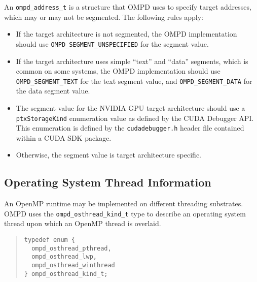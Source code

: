 An \verb|ompd_address_t| is a structure that OMPD uses to specify
target addresses, which may or may not be segmented.  The following
rules apply:
\begin{itemize}
%
\item
If the target architecture is not segmented, the OMPD implementation
should use \verb|OMPD_SEGMENT_UNSPECIFIED| for the segment value.
%
\item
If the target architecture uses simple ``text'' and ``data'' segments,
which is common on some systems, the OMPD implementation should use
\verb|OMPD_SEGMENT_TEXT| for the text segment value, and
\verb|OMPD_SEGMENT_DATA| for the data segment value.
%
\item
The segment value for the NVIDIA\textsuperscript{\textregistered} GPU
target architecture should use a \verb|ptxStorageKind| enumeration
value as defined by the CUDA Debugger API.
%
This enumeration is defined by the \verb|cudadebugger.h| header file
contained within a CUDA SDK package.
%
%
\item
Otherwise, the segment value is target architecture specific.
\end{itemize}


\subsection{Operating System Thread Information}

An OpenMP runtime may be implemented on different threading substrates.
OMPD uses the \verb|ompd_osthread_kind_t| type to describe an operating
system thread upon which an OpenMP thread is overlaid.

\begin{quote}
\begin{lstlisting}
typedef enum {
  ompd_osthread_pthread,
  ompd_osthread_lwp,
  ompd_osthread_winthread
} ompd_osthread_kind_t;
\end{lstlisting}
\end{quote}

